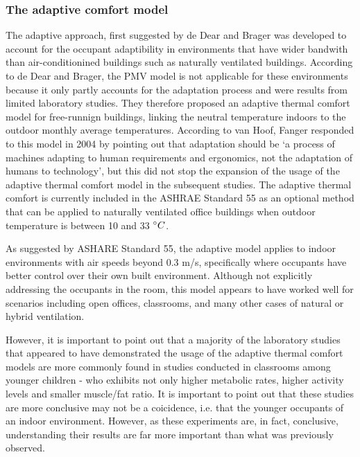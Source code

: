 \subsubsection{The adaptive comfort model}
    The adaptive approach, first suggested by de Dear and Brager \cite{de_dear_developing_1998} was developed to account for the occupant adaptibility in environments that have wider bandwith than air-conditionined buildings such as naturally ventilated buildings. According to de Dear and Brager, the PMV model is not applicable for these environments because it only partly accounts for the adaptation process and were results from limited laboratory studies. They therefore proposed an adaptive thermal comfort model for free-runnign buildings, linking the neutral temperature indoors to the outdoor monthly average temperatures. According to van Hoof, Fanger responded to this model in 2004 by pointing out that adaptation should be `a process of machines adapting to human requirements and ergonomics, not the adaptation of humans to technology'\cite{van_hoof_forty_2008}, but this did not stop the expansion of the usage of the adaptive thermal comfort model in the subsequent studies. The adaptive thermal comfort is currently included in the ASHRAE Standard 55 as an optional method that can be applied to naturally ventilated office buildings when outdoor temperature is between 10 and 33 $\degree C$. %

	As suggested by ASHARE Standard 55, the adaptive model applies to indoor environments with air speeds beyond 0.3 m/s, specifically where occupants have better control over their own built environment. Although not explicitly addressing the occupants in the room, this model appears to have worked well for scenarios including open offices, classrooms, and many other cases of natural or hybrid ventilation. 
    
	However, it is important to point out that a majority of the laboratory studies that appeared to have demonstrated the usage of the adaptive thermal comfort models are more commonly found in studies conducted in classrooms among younger children - who exhibits not only higher metabolic rates, higher activity levels and smaller muscle/fat ratio. It is important to point out that these studies are more conclusive may not be a coicidence, i.e. that the younger occupants of an indoor environment. However, as these experiments are, in fact, conclusive, understanding their results are far more important than what was previously observed. %

